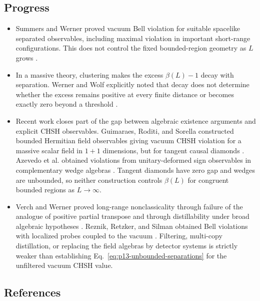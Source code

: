 \subsection*{Progress}

\begin{itemize}
  \item Summers and Werner proved vacuum Bell violation for suitable spacelike
  separated observables, including maximal violation in important
  short-range configurations.  This does not control the fixed bounded-region
  geometry as $L$ grows
  .

  \item In a massive theory, clustering makes the excess
  $\beta(L)-1$ decay with separation.  Werner and Wolf explicitly noted that
  decay does not determine whether the excess remains positive at every
  finite distance or becomes exactly zero beyond a threshold
  .

  \item Recent work closes part of the gap between algebraic existence
  arguments and explicit CHSH observables.  Guimaraes, Roditi, and Sorella
  constructed bounded Hermitian field observables giving vacuum CHSH
  violation for a massive scalar field in $1+1$ dimensions, but for tangent
  causal diamonds
  .  Azevedo et al. obtained
  violations from unitary-deformed sign observables in complementary wedge
  algebras
  .  Tangent diamonds have zero
  gap and wedges are unbounded, so neither construction controls $\beta(L)$
  for congruent bounded regions as $L\to\infty$.

  \item Verch and Werner proved long-range nonclassicality through failure of
  the analogue of positive partial transpose and through distillability under
  broad algebraic hypotheses
  .  Reznik, Retzker, and Silman
  obtained Bell violations with localized probes coupled to the vacuum
  .  Filtering, multi-copy distillation, or
  replacing the field algebras by detector systems is strictly weaker than
  establishing Eq.~\eqref{eq:p13-unbounded-separations} for the unfiltered
  vacuum CHSH value.
\end{itemize}

\subsection*{References}

